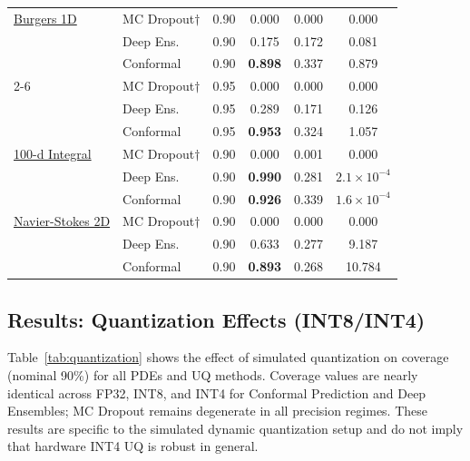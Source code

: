 \documentclass[12pt,a4paper]{article}
\theoremstyle{plain}
\begin{document}
\begin{table}[ht]
\begin{tabular}{llcccc}
        \underline{Burgers 1D}
        & MC Dropout$\dagger$    & 0.90 & 0.000 & 0.000 & 0.000 \\
        & Deep Ens.              & 0.90 & 0.175 & 0.172 & 0.081 \\
        & Conformal              & 0.90 & \textbf{0.898} & 0.337 & 0.879 \\
        \cline{2-6}
        & MC Dropout$\dagger$    & 0.95 & 0.000 & 0.000 & 0.000 \\
        & Deep Ens.              & 0.95 & 0.289 & 0.171 & 0.126 \\
        & Conformal              & 0.95 & \textbf{0.953} & 0.324 & 1.057 \\
        \midrule
        \underline{100-d Integral}
        & MC Dropout$\dagger$    & 0.90 & 0.000 & 0.001 & 0.000 \\
        & Deep Ens.              & 0.90 & \textbf{0.990} & 0.281 & $2.1\times10^{-4}$ \\
        & Conformal              & 0.90 & \textbf{0.926} & 0.339 & $1.6\times10^{-4}$ \\
        \midrule
        \underline{Navier-Stokes 2D}
        & MC Dropout$\dagger$    & 0.90 & 0.000 & 0.000 & 0.000 \\
        & Deep Ens.              & 0.90 & 0.633 & 0.277 & 9.187 \\
        & Conformal              & 0.90 & \textbf{0.893} & 0.268 & 10.784 \\
        \bottomrule
    \end{tabular}
    \label{tab:uq_results_fp32}
\end{table}

\clearpage
\subsection{Results: Quantization Effects (INT8/INT4)}
\label{sec:quant_table}

Table~\ref{tab:quantization} shows the effect of simulated quantization
on coverage (nominal 90\%) for all PDEs and UQ methods.
Coverage values are nearly identical across FP32, INT8, and INT4 for
Conformal Prediction and Deep Ensembles; MC Dropout remains
degenerate in all precision regimes.
These results are specific to the simulated dynamic quantization
setup and do not imply that hardware INT4 UQ is robust in general.
\end{document}
